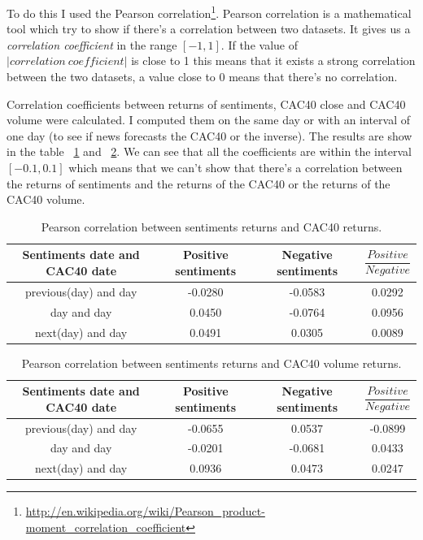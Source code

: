 \documentclass[12pt]{report}
\begin{document}
			To do this I used the Pearson correlation\footnote{\url{http://en.wikipedia.org/wiki/Pearson_product-moment_correlation_coefficient}}. Pearson correlation is a mathematical tool which try to show if there's a correlation between two datasets. It gives us a \emph{correlation coefficient} in the range $[-1, 1]$. If the value of $|correlation\ coefficient|$ is close to 1 this means that it exists a strong correlation between the two datasets, a value close to 0 means that there's no correlation.
			
			Correlation coefficients between returns of sentiments, CAC40 close and CAC40 volume were calculated. I computed them on the same day or with an interval of one day (to see if news forecasts the CAC40 or the inverse). The results are show in the table ~\ref{pearson_cac} and ~\ref{pearson_volume}. We can see that all the coefficients are within the interval $[-0.1, 0.1]$ which means that we can't show that there's a correlation between the returns of sentiments and the returns of the CAC40 or the returns of the CAC40 volume.
			
			\begin{table}
			\begin{tabular}{|c | c | c | c|}
				\hline
				Sentiments date and CAC40 date & Positive sentiments & Negative sentiments & $\dfrac{Positive}{Negative}$\\
				\hline
				previous(day) and day & -0.0280 & -0.0583 & 0.0292\\
				\hline
				day and day & 0.0450 & -0.0764 & 0.0956\\
				\hline
				next(day) and day & 0.0491 & 0.0305 & 0.0089\\
				\hline
			\end{tabular}
			
			\caption{Pearson correlation between sentiments returns and CAC40 returns.\label{pearson_cac}}
			\end{table}


			\begin{table}
			\begin{tabular}{|c | c | c | c|}
				\hline
				Sentiments date and CAC40 date & Positive sentiments & Negative sentiments & $\dfrac{Positive}{Negative}$\\
				\hline
				previous(day) and day & -0.0655 & 0.0537 & -0.0899\\
				\hline
				day and day & -0.0201 & -0.0681 & 0.0433\\
				\hline
				next(day) and day & 0.0936 & 0.0473 & 0.0247\\
				\hline
			\end{tabular}
			
			\caption{Pearson correlation between sentiments returns and CAC40 volume returns.\label{pearson_volume}}
			\end{table}
			
\end{document}
